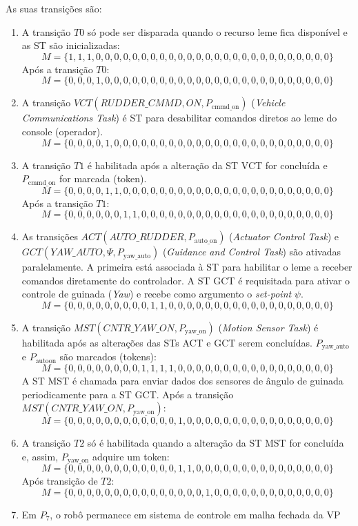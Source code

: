 As suas transições são:
\begin{enumerate}
  \item A transição $T0$ só pode ser disparada quando o recurso leme fica
  disponível e as ST são inicializadas:
 $$M
=\{1,1,1,0,0,0,0,0,0,0,0,0,0,0,0,0,0,0,0,0,0,0,0,0,0,0,0,0,0\}$$
Após a transição $T0$:
  $$M
=\{0,0,0,1,0,0,0,0,0,0,0,0,0,0,0,0,0,0,0,0,0,0,0,0,0,0,0,0,0\}$$  
  \item A transição $VCT(RUDDER\_CMMD,ON,P_{\textrm{cmmd\_on}})$
  (\emph{Vehicle Communications Task}) é ST para desabilitar comandos diretos ao
  leme do console (operador).
$$M
=\{0,0,0,0,1,0,0,0,0,0,0,0,0,0,0,0,0,0,0,0,0,0,0,0,0,0,0,0,0\}$$ 
  \item A transição $T1$ é habilitada após a alteração da ST VCT for concluída
  e $P_{\textrm{cmmd\_on}}$ for marcada (token). $$M
=\{0,0,0,0,1,1,0,0,0,0,0,0,0,0,0,0,0,0,0,0,0,0,0,0,0,0,0,0,0\}$$
Após a transição $T1$:
$$M
=\{0,0,0,0,0,0,1,1,0,0,0,0,0,0,0,0,0,0,0,0,0,0,0,0,0,0,0,0,0\}$$
  \item As transições $ACT(AUTO\_RUDDER,P_{\textrm{auto\_on}})$
  (\emph{Actuator Control Task}) e $GCT(YAW\_AUTO,\Psi,P_{\textrm{yaw\_auto}})$
  (\emph{Guidance and Control Task}) são ativadas paralelamente. A primeira está
  associada à ST para habilitar o leme a receber comandos diretamente do
  controlador. A ST GCT é requisitada para ativar o controle de guinada
  (\emph{Yaw}) e recebe como argumento o \emph{set-point} $\psi$.
$$M
=\{0,0,0,0,0,0,0,0,0,1,1,0,0,0,0,0,0,0,0,0,0,0,0,0,0,0,0,0,0\}$$
  \item A transição $MST(CNTR\_YAW\_ON,P_{\textrm{yaw\_on}})$ (\emph{Motion
  Sensor Task}) é habilitada após as alterações das STs ACT e GCT serem
  concluídas.
  $P_{\textrm{yaw\_auto}}$ e $P_{\textrm{autoon}}$ são marcados (tokens):
  $$M
=\{0,0,0,0,0,0,0,0,1,1,1,1,0,0,0,0,0,0,0,0,0,0,0,0,0,0,0,0,0\}$$
A ST MST é chamada para enviar dados dos sensores de ângulo de guinada
periodicamente para a ST GCT.
Após a transição
$MST(CNTR\_YAW\_ON,P_{\textrm{yaw\_on}})$:
  $$M
=\{0,0,0,0,0,0,0,0,0,0,0,0,1,0,0,0,0,0,0,0,0,0,0,0,0,0,0,0,0\}$$
  \item A transição $T2$ só é habilitada quando a alteração da ST MST for
  concluída e, assim, $P_{\textrm{yaw\_on}}$ adquire um token:
    $$M
=\{0,0,0,0,0,0,0,0,0,0,0,0,1,1,0,0,0,0,0,0,0,0,0,0,0,0,0,0,0\}$$
Após transição de $T2$:
$$M
=\{0,0,0,0,0,0,0,0,0,0,0,0,0,0,0,1,0,0,0,0,0,0,0,0,0,0,0,0,0\}$$
  \item Em $P_7$, o robô permanece em sistema de controle em malha fechada da VP

\end{enumerate}
